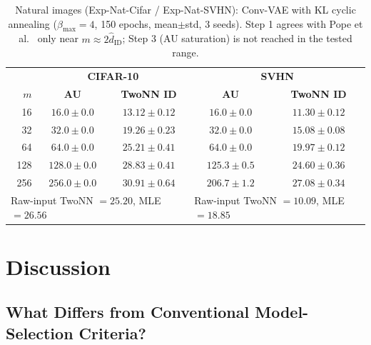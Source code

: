 \documentclass[make,article,submit,pdftex,moreauthors]{Definitions/mdpi}
\newcommand{\hatdID}{\hat{d}_{\mathrm{ID}}}
\begin{document}
\begin{table}[H]
\caption{Natural images (Exp-Nat-Cifar / Exp-Nat-SVHN): Conv-VAE with KL
cyclic annealing ($\beta_{\max} = 4$, 150 epochs, mean$\pm$std, 3 seeds).
Step 1 agrees with Pope et al.~\cite{pope2021intrinsic} only near
$m \approx 2\hatdID$; Step 3 (AU saturation) is not reached in the tested
range.}
\label{tab:natural}
\small
\begin{tabular}{r cc | cc}
\toprule
 & \multicolumn{2}{c|}{\textbf{CIFAR-10}} & \multicolumn{2}{c}{\textbf{SVHN}} \\
$m$ & \textbf{AU} & \textbf{TwoNN ID} & \textbf{AU} & \textbf{TwoNN ID} \\
\midrule
 16 & $16.0 \pm 0.0$ & $13.12 \pm 0.12$ & $16.0 \pm 0.0$ & $11.30 \pm 0.12$ \\
 32 & $32.0 \pm 0.0$ & $19.26 \pm 0.23$ & $32.0 \pm 0.0$ & $15.08 \pm 0.08$ \\
 64 & $64.0 \pm 0.0$ & $\mathbf{25.21 \pm 0.41}$ & $64.0 \pm 0.0$ & $19.97 \pm 0.12$ \\
128 & $128.0 \pm 0.0$ & $28.83 \pm 0.41$ & $125.3 \pm 0.5$ & $24.60 \pm 0.36$ \\
256 & $256.0 \pm 0.0$ & $30.91 \pm 0.64$ & $206.7 \pm 1.2$ & $27.08 \pm 0.34$ \\
\midrule
\multicolumn{3}{l|}{Raw-input TwoNN $= 25.20$, MLE $= 26.56$} &
\multicolumn{2}{l}{Raw-input TwoNN $= 10.09$, MLE $= 18.85$} \\
\bottomrule
\end{tabular}
\end{table}

\section{Discussion}\label{sec:discussion}

\subsection{What Differs from Conventional Model-Selection Criteria?}\label{sec:disc_model_selection}
\end{document}
